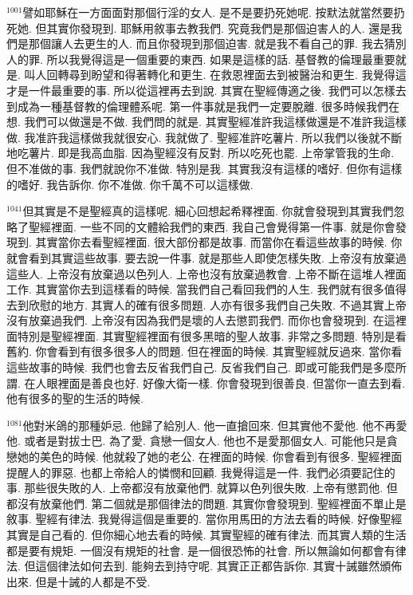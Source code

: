 \documentclass{book}
\begin{document}
$^{1001}$譬如耶穌在一方面面對那個行淫的女人.
是不是要扔死她呢.
按默法就當然要扔死她.
但其實你發現到.
耶穌用敘事去教我們.
究竟我們是那個迫害人的人.
還是我們是那個讓人去更生的人.
而且你發現到那個迫害.
就是我不看自己的罪.
我去猜別人的罪.
所以我覺得這是一個重要的東西.
如果是這樣的話.
基督教的倫理最重要就是.
叫人回轉尋到盼望和得著轉化和更生.
在救恩裡面去到被醫治和更生.
我覺得這才是一件最重要的事.
所以從這裡再去到說.
其實在聖經傳適之後.
我們可以怎樣去到成為一種基督教的倫理體系呢.
第一件事就是我們一定要脫離.
很多時候我們在想.
我們可以做還是不做.
我們問的就是.
其實聖經准許我這樣做還是不准許我這樣做.
我准許我這樣做我就很安心.
我就做了.
聖經准許吃薯片.
所以我們以後就不斷地吃薯片.
即是我高血脂.
因為聖經沒有反對.
所以吃死也罷.
上帝掌管我的生命.
但不准做的事.
我們就說你不准做.
特別是我.
其實我沒有這樣的嗜好.
但你有這樣的嗜好.
我告訴你.
你不准做.
你千萬不可以這樣做.

$^{1041}$但其實是不是聖經真的這樣呢.
細心回想起希釋裡面.
你就會發現到其實我們忽略了聖經裡面.
一些不同的文體給我們的東西.
我自己會覺得第一件事.
就是你會發現到.
其實當你去看聖經裡面.
很大部份都是故事.
而當你在看這些故事的時候.
你就會看到其實這些故事.
要去說一件事.
就是那些人即使怎樣失敗.
上帝沒有放棄過這些人.
上帝沒有放棄過以色列人.
上帝也沒有放棄過教會.
上帝不斷在這堆人裡面工作.
其實當你去到這樣看的時候.
當我們自己看回我們的人生.
我們就有很多值得去到欣慰的地方.
其實人的確有很多問題.
人亦有很多我們自己失敗.
不過其實上帝沒有放棄過我們.
上帝沒有因為我們是壞的人去懲罰我們.
而你也會發現到.
在這裡面特別是聖經裡面.
其實聖經裡面有很多黑暗的聖人故事.
非常之多問題.
特別是看舊約.
你會看到有很多很多人的問題.
但在裡面的時候.
其實聖經就反過來.
當你看這些故事的時候.
我們也會去反省我們自己.
反省我們自己.
即或可能我們是多麼所謂.
在人眼裡面是善良也好.
好像大衛一樣.
你會發現到很善良.
但當你一直去到看.
他有很多的聖的生活的時候.

$^{1081}$他對米鴿的那種妒忌.
他歸了給別人.
他一直搶回來.
但其實他不愛他.
他不再愛他.
或者是對拔士巴.
為了愛.
貪戀一個女人.
他也不是愛那個女人.
可能他只是貪戀她的美色的時候.
他就殺了她的老公.
在裡面的時候.
你會看到有很多.
聖經裡面提醒人的罪惡.
也都上帝給人的憐憫和回顧.
我覺得這是一件.
我們必須要記住的事.
那些很失敗的人.
上帝都沒有放棄他們.
就算以色列很失敗.
上帝有懲罰他.
但都沒有放棄他們.
第二個就是那個律法的問題.
其實你會發現到.
聖經裡面不單止是敘事.
聖經有律法.
我覺得這個是重要的.
當你用馬田的方法去看的時候.
好像聖經其實是自己看的.
但你細心地去看的時候.
其實聖經的確有律法.
而其實人類的生活都是要有規矩.
一個沒有規矩的社會.
是一個很恐怖的社會.
所以無論如何都會有律法.
但這個律法如何去到.
能夠去到持守呢.
其實正正都告訴你.
其實十誡雖然頒佈出來.
但是十誡的人都是不受.
\end{document}
